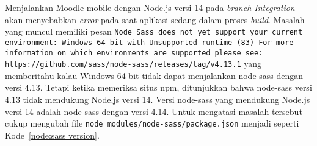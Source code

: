 Menjalankan Moodle mobile dengan Node.js versi 14 pada \textit{branch Integration} akan menyebabkan \textit{error} pada saat aplikasi sedang dalam proses \textit{build}. Masalah yang muncul memiliki pesan \texttt{Node Sass does not yet support your current environment: Windows 64-bit with Unsupported runtime (83)
For more information on which environments are supported please see:
\url{https://github.com/sass/node-sass/releases/tag/v4.13.1}} yang memberitahu kalau Windows 64-bit tidak dapat menjalankan node-sass dengan versi 4.13. Tetapi ketika memeriksa situs npm, ditunjukkan bahwa node-sass versi 4.13 tidak mendukung Node.js versi 14. Versi node-sass yang mendukung Node.js versi 14 adalah node-sass dengan versi 4.14\cite{node:sass}. Untuk mengatasi masalah tersebut cukup mengubah file \texttt{node\_modules/node-sass/package.json} menjadi seperti \mbox{Kode \ref{node:sass version}}.

